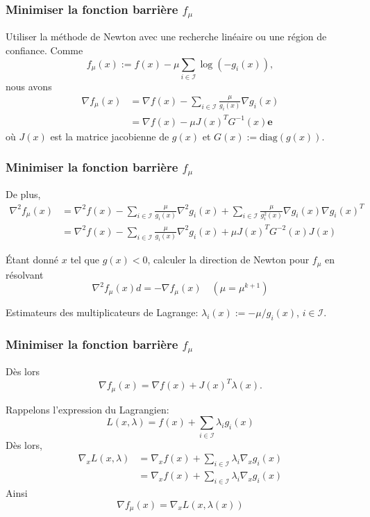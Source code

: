 \documentclass[usepdftitle=false,aspectratio=169]{beamer}
\def\cI{\mathcal{I}}
\def\be{\boldsymbol{e}}
\begin{document}
\begin{frame}
\frametitle{Minimiser la fonction barrière $f_{\mu}$}

Utiliser la méthode de Newton avec une recherche linéaire ou une région de confiance.
Comme
$$
f_{\mu}(x) := f(x) - \mu \sum_{i \in \cI} \log (-g_i(x)),
$$
nous avons
\begin{align*}
\nabla f_{\mu}(x) &= \nabla f(x) - \sum_{i \in \cI} \frac{\mu}{g_i(x)} \nabla g_i(x) \\
&= \nabla f(x) - \mu J(x)^T G^{-1}(x) \be
\end{align*}
où $J(x)$ est la matrice jacobienne de $g(x)$ et $G(x) := \mbox{diag}(g(x))$.

\end{frame}

\begin{frame}
\frametitle{Minimiser la fonction barrière $f_{\mu}$}

De plus,
\begin{align*}
\nabla^2 f_{\mu}(x) &= \nabla^2 f(x) - \sum_{i \in \cI} \frac{\mu}{g_i(x)} \nabla^2 g_i(x) + \sum_{i \in \cI} \frac{\mu}{g^2_i(x)} \nabla g_i(x) \nabla g_i(x)^T \\
&= \nabla^2 f(x) - \sum_{i \in \cI} \frac{\mu}{g_i(x)} \nabla^2 g_i(x) + \mu J(x)^T G^{-2}(x)J(x)
\end{align*}

Étant donné $x$ tel que $g(x) < 0$, calculer la direction de Newton pour $f_{\mu}$ en résolvant
$$
\nabla^2 f_{\mu}(x) d = -\nabla f_{\mu}(x)\quad (\mu = \mu^{k+1})
$$

\mbox{}

Estimateurs des multiplicateurs de Lagrange: $\lambda_i (x) := - \mu/g_i(x)$, $i \in \cI$.

\end{frame}

\begin{frame}
\frametitle{Minimiser la fonction barrière $f_{\mu}$}

Dès lors
$$
\nabla f_{\mu}(x) = \nabla f(x) + J(x)^T \lambda(x).
$$

\mbox{}

Rappelons l'expression du Lagrangien:
$$
L(x,\lambda) = f(x)+\sum_{i \in \cI} \lambda_i g_i(x)
$$
Dès lors,
\begin{align*}
\nabla_x L(x,\lambda)
& = \nabla_x f(x)+\sum_{i \in \cI} \lambda_i \nabla_x g_i(x) \\
& = \nabla_x f(x)+\sum_{i \in \cI} \lambda_i \nabla_x g_i(x)
\end{align*}
Ainsi
$$
\nabla f_{\mu}(x) = \nabla_x L(x,\lambda(x))
$$

\end{frame}
\end{document}
